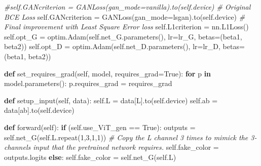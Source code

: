 \documentclass[
]{article}
\newenvironment{Shaded}{}{}
\newcommand{\CommentTok}[1]{\textcolor[rgb]{0.38,0.63,0.69}{\textit{#1}}}
\newcommand{\ControlFlowTok}[1]{\textcolor[rgb]{0.00,0.44,0.13}{\textbf{#1}}}
\newcommand{\DecValTok}[1]{\textcolor[rgb]{0.25,0.63,0.44}{#1}}
\newcommand{\KeywordTok}[1]{\textcolor[rgb]{0.00,0.44,0.13}{\textbf{#1}}}
\newcommand{\NormalTok}[1]{#1}
\newcommand{\OperatorTok}[1]{\textcolor[rgb]{0.40,0.40,0.40}{#1}}
\newcommand{\StringTok}[1]{\textcolor[rgb]{0.25,0.44,0.63}{#1}}
\newcommand{\VariableTok}[1]{\textcolor[rgb]{0.10,0.09,0.49}{#1}}
\begin{document}
\begin{Shaded}
\begin{Highlighting}[]
        \CommentTok{\#self.GANcriterion = GANLoss(gan\_mode=\textquotesingle{}vanilla\textquotesingle{}).to(self.device)  \# Original BCE Loss}
        \VariableTok{self}\NormalTok{.GANcriterion }\OperatorTok{=}\NormalTok{ GANLoss(gan\_mode}\OperatorTok{=}\StringTok{\textquotesingle{}lsgan\textquotesingle{}}\NormalTok{).to(}\VariableTok{self}\NormalTok{.device)  }\CommentTok{\# Final improvement with Least Square Error loss}
        \VariableTok{self}\NormalTok{.L1criterion }\OperatorTok{=}\NormalTok{ nn.L1Loss()}
        \VariableTok{self}\NormalTok{.opt\_G }\OperatorTok{=}\NormalTok{ optim.Adam(}\VariableTok{self}\NormalTok{.net\_G.parameters(), lr}\OperatorTok{=}\NormalTok{lr\_G, betas}\OperatorTok{=}\NormalTok{(beta1, beta2))}
        \VariableTok{self}\NormalTok{.opt\_D }\OperatorTok{=}\NormalTok{ optim.Adam(}\VariableTok{self}\NormalTok{.net\_D.parameters(), lr}\OperatorTok{=}\NormalTok{lr\_D, betas}\OperatorTok{=}\NormalTok{(beta1, beta2))}
    
    \KeywordTok{def}\NormalTok{ set\_requires\_grad(}\VariableTok{self}\NormalTok{, model, requires\_grad}\OperatorTok{=}\VariableTok{True}\NormalTok{):}
        \ControlFlowTok{for}\NormalTok{ p }\KeywordTok{in}\NormalTok{ model.parameters():}
\NormalTok{            p.requires\_grad }\OperatorTok{=}\NormalTok{ requires\_grad}
        
    \KeywordTok{def}\NormalTok{ setup\_input(}\VariableTok{self}\NormalTok{, data):}
        \VariableTok{self}\NormalTok{.L }\OperatorTok{=}\NormalTok{ data[}\StringTok{\textquotesingle{}L\textquotesingle{}}\NormalTok{].to(}\VariableTok{self}\NormalTok{.device)}
        \VariableTok{self}\NormalTok{.ab }\OperatorTok{=}\NormalTok{ data[}\StringTok{\textquotesingle{}ab\textquotesingle{}}\NormalTok{].to(}\VariableTok{self}\NormalTok{.device)}
        
    \KeywordTok{def}\NormalTok{ forward(}\VariableTok{self}\NormalTok{):}
        \ControlFlowTok{if}\NormalTok{ (}\VariableTok{self}\NormalTok{.use\_ViT\_gen }\OperatorTok{==} \VariableTok{True}\NormalTok{):}
\NormalTok{            outputs }\OperatorTok{=} \VariableTok{self}\NormalTok{.net\_G(}\VariableTok{self}\NormalTok{.L.repeat(}\DecValTok{1}\NormalTok{,}\DecValTok{3}\NormalTok{,}\DecValTok{1}\NormalTok{,}\DecValTok{1}\NormalTok{))  }\CommentTok{\# Copy the L channel 3 times to mimick the 3{-}channels input that the pretrained network requires.}
            \VariableTok{self}\NormalTok{.fake\_color }\OperatorTok{=}\NormalTok{ outputs.logits}
        \ControlFlowTok{else}\NormalTok{:}
            \VariableTok{self}\NormalTok{.fake\_color }\OperatorTok{=} \VariableTok{self}\NormalTok{.net\_G(}\VariableTok{self}\NormalTok{.L)}
    

\end{Highlighting}
\end{Shaded}
\end{document}
